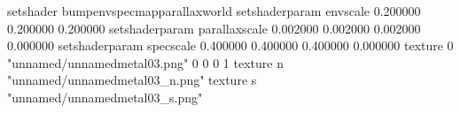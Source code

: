 setshader bumpenvspecmapparallaxworld
setshaderparam envscale 0.200000 0.200000 0.200000
setshaderparam parallaxscale 0.002000 0.002000 0.002000 0.000000
setshaderparam specscale 0.400000 0.400000 0.400000 0.000000
texture 0 "unnamed/unnamedmetal03.png" 0 0 0 1
texture n "unnamed/unnamedmetal03_n.png"
texture s "unnamed/unnamedmetal03_s.png"